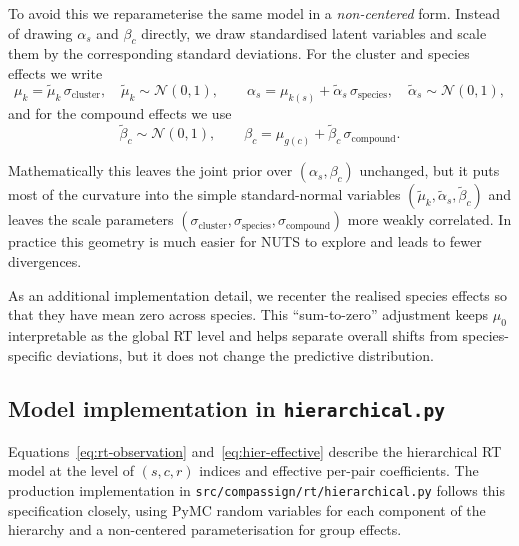 \documentclass[11pt]{article}
\begin{document}
To avoid this we reparameterise the same model in a \emph{non-centered} form. Instead
of drawing $\alpha_s$ and $\beta_c$ directly, we draw standardised latent variables and
scale them by the corresponding standard deviations. For the cluster and species
effects we write
\begin{equation}
  \mu_k=\tilde{\mu}_k\,\sigma_{\mathrm{cluster}},
  \quad
  \tilde{\mu}_k\sim\mathcal{N}(0,1),
  \qquad
  \alpha_s=\mu_{k(s)}+\tilde{\alpha}_s\,\sigma_{\mathrm{species}},
  \quad
  \tilde{\alpha}_s\sim\mathcal{N}(0,1),
\end{equation}
and for the compound effects we use
\begin{equation}
  \tilde{\beta}_c\sim\mathcal{N}(0,1),
  \qquad
  \beta_c=\mu_{g(c)}+\tilde{\beta}_c\,\sigma_{\mathrm{compound}}.
\end{equation}

Mathematically this leaves the joint prior over $(\alpha_s,\beta_c)$ unchanged, but it
puts most of the curvature into the simple standard-normal variables
$(\tilde{\mu}_k,\tilde{\alpha}_s,\tilde{\beta}_c)$ and leaves the scale parameters
$(\sigma_{\mathrm{cluster}},\sigma_{\mathrm{species}},\sigma_{\mathrm{compound}})$ more
weakly correlated. In practice this geometry is much easier for NUTS to explore and
leads to fewer divergences.

As an additional implementation detail, we recenter the realised species effects so
that they have mean zero across species. This ``sum-to-zero'' adjustment keeps $\mu_0$
interpretable as the global RT level and helps separate overall shifts from
species-specific deviations, but it does not change the predictive distribution.

\subsection{Model implementation in \texttt{hierarchical.py}}

Equations~\eqref{eq:rt-observation} and~\eqref{eq:hier-effective} describe the
hierarchical RT model at the level of $(s,c,r)$ indices and effective per-pair
coefficients. The production implementation in
\texttt{src/compassign/rt/hierarchical.py} follows this specification closely, using
PyMC random variables for each component of the hierarchy and a non-centered
parameterisation for group effects.
\end{document}
